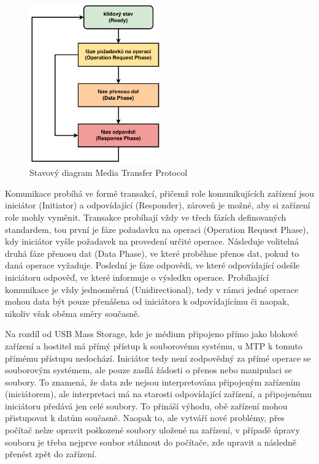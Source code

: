 \begin{figure}[h]
    \centering
    \includegraphics[width=0.50\textwidth]{obrazky-figures/mtp_phases-cz.pdf}
    
    \caption{Stavový diagram Media Transfer Protocol \cite{silicon_labs_mass_storage_protocol}}
    \label{fig:mtp-protocol}
\end{figure}

Komunikace probíhá ve formě transakcí, přičemž role komunikujících zařízení jsou iniciátor (Initiator) a odpovídající (Responder), zároveň je možné, aby si zařízení role mohly vyměnit. Transakce probíhají vždy ve třech fázích definovaných standardem, tou první je fáze požadavku na operaci (Operation Request Phase), kdy iniciátor vyšle požadavek na provedení určité operace. Následuje volitelná druhá fáze přenosu dat (Data Phase), ve které proběhne přenos dat, pokud to daná operace vyžaduje. Poslední je fáze odpovědi, ve které odpovídající odešle iniciátoru odpověď, ve které informuje o výsledku operace. Probíhající komunikace je vždy jednosměrná (Unidirectional), tedy v rámci jedné operace mohou data být pouze přenášena od iniciátora k odpovídajícímu či naopak, nikoliv však oběma směry současně. 


Na rozdíl od USB Mass Storage, kde je médium připojeno přímo jako blokové zařízení a hostitel má přímý přístup k souborovému systému, u MTP k tomuto přímému přístupu nedochází. Iniciátor tedy není zodpovědný za přímé operace se souborovým systémem, ale pouze zasílá žádosti o přenos nebo manipulaci se soubory. To znamená, že data zde nejsou interpretována připojeným zařízením (iniciátorem), ale interpretaci má na starosti odpovídající zařízení, a připojenému iniciátoru předává jen celé soubory. To přináší výhodu, obě zařízení mohou přistupovat k datům současně. Naopak to, ale vytváří nové problémy, přes počítač nelze opravit poškozené soubory uložené na zařízení, v případě úpravy souboru je třeba nejprve soubor stáhnout do počítače, zde upravit a následně přenést zpět do zařízení.

